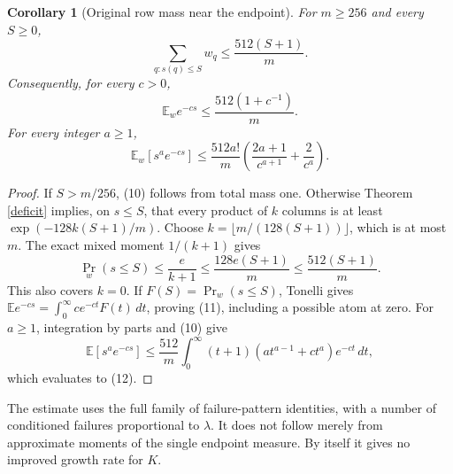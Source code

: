 \documentclass[11pt]{article}
\newtheorem{corollary}{Corollary}
\newcommand{\E}{\mathbb E}
\begin{document}
\begin{corollary}[Original row mass near the endpoint]\label{mass}
For $m\ge256$ and every $S\ge0$,
\[
 \sum_{q:s(q)\le S}w_q\le\frac{512(S+1)}m.       \tag{10}
\]
Consequently, for every $c>0$,
\[
 \E_w e^{-cs}\le\frac{512(1+c^{-1})}m.            \tag{11}
\]
For every integer $a\ge1$,
\[
 \E_w[s^a e^{-cs}]
 \le\frac{512a!}m\left(\frac{2a+1}{c^{a+1}}
                         +\frac2{c^a}\right).    \tag{12}
\]
\end{corollary}
\begin{proof}
If $S>m/256$, (10) follows from total mass one. Otherwise Theorem
\ref{deficit} implies, on $s\le S$, that every product of $k$
columns is at least $\exp(-128k(S+1)/m)$. Choose
$k=\lfloor m/(128(S+1))\rfloor$, which is at most $m$.
The exact mixed moment $1/(k+1)$ gives
\[
 \Pr_w(s\le S)\le\frac e{k+1}
       \le\frac{128e(S+1)}m\le\frac{512(S+1)}m.
\]
This also covers $k=0$. If $F(S)=\Pr_w(s\le S)$, Tonelli gives
$\E e^{-cs}=\int_0^\infty ce^{-ct}F(t)\,dt$, proving (11),
including a possible atom at zero. For $a\ge1$, integration by
parts and (10) give
\[
 \E[s^ae^{-cs}]
 \le\frac{512}m\int_0^\infty(t+1)
       (a t^{a-1}+c t^a)e^{-ct}\,dt,
\]
which evaluates to (12).
\end{proof}

The estimate uses the full family of failure-pattern identities,
with a number of conditioned failures proportional to $\lambda$.
It does not follow merely from approximate moments of the single
endpoint measure. By itself it gives no improved growth rate for $K$.
\end{document}
